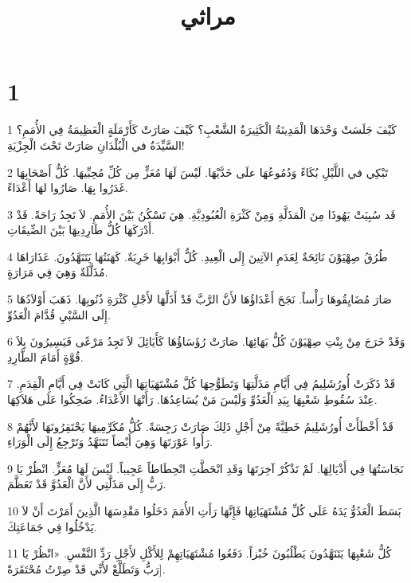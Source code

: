 

\title{مراثي}


\chapter{1}

\par 1 كَيْفَ جَلَسَتْ وَحْدَهَا الْمَدِينَةُ الْكَثِيرَةُ الشَّعْبِ؟ كَيْفَ صَارَتْ كَأَرْمَلَةٍ الْعَظِيمَةُ فِي الأُمَمِ؟ السَّيِّدَةُ في الْبُلْدَانِ صَارَتْ تَحْتَ الْجِزْيَةِ!
\par 2 تَبْكِي في اللَّيْلِ بُكَاءً وَدُمُوعُهَا علَى خَدَّيْهَا. لَيْسَ لَهَا مُعَزٍّ مِن كُلِّ مُحِبِّيهَا. كُلُّ أَصْحَابِهَا غَدَرُوا بِهَا. صَارُوا لهَا أَعْدَاءً.
\par 3 قَد سُبِيَتْ يَهُوذَا مِنَ الْمَذَلَّةِ وَمِنْ كَثْرَةِ الْعُبُودِيَّةِ. هِيَ تَسْكُنُ بَيْنَ الأُمَمِ. لاَ تَجِدُ رَاحَةً. قَدْ أَدْرَكَهَا كُلُّ طَارِدِيهَا بَيْنَ الضِّيقَاتِ.
\par 4 طُرُقُ صِهْيَوْنَ نَائِحَةٌ لِعَدَمِ الآتِينَ إِلَى الْعِيدِ. كُلُّ أَبْوَابِهَا خَرِبَةٌ. كَهَنَتُهَا يَتَنَهَّدُونَ. عَذَارَاهَا مُذَلَّلَةٌ وَهِيَ فِي مَرَارَةٍ.
\par 5 صَارَ مُضَايِقُوهَا رَأْساً. نَجَحَ أَعْدَاؤُهَا لأَنَّ الرَّبَّ قَدْ أَذَلَّهَا لأَجْلِ كَثْرَةِ ذُنُوبِهَا. ذَهَبَ أَوْلاَدُهَا إِلَى السَّبْيِ قُدَّامَ الْعَدُوِّ.
\par 6 وَقَدْ خَرَجَ مِنْ بِنْتِ صِهْيَوْنَ كُلُّ بَهَائِهَا. صَارَتْ رُؤَسَاؤُهَا كَأَيَائِلَ لاَ تَجِدُ مَرْعًى فَيَسِيرُونَ بِلاَ قُوَّةٍ أَمَامَ الطَّارِدِ.
\par 7 قَدْ ذَكَرَتْ أُورُشَلِيمُ فِي أَيَّامِ مَذَلَّتِهَا وَتَطَوُّحِهَا كُلَّ مُشْتَهَيَاتِهَا الَّتِي كَانَتْ فِي أَيَّامِ الْقِدَمِ. عِنْدَ سُقُوطِ شَعْبِهَا بِيَدِ الْعَدُوِّ وَلَيْسَ مَنْ يُسَاعِدُهَا. رَأَتْهَا الأَعْدَاءُ. ضَحِكُوا عَلَى هَلاَكِهَا.
\par 8 قَدْ أَخْطَأَتْ أُورُشَلِيمُ خَطِيَّةً مِنْ أَجْلِ ذَلِكَ صَارَتْ رَجِسَةً. كُلُّ مُكَرِّمِيهَا يَحْتَقِرُونَهَا لأَنَّهُمْ رَأُوا عَوْرَتَهَا وَهِيَ أَيْضاً تَتَنَهَّدُ وَتَرْجِعُ إِلَى الْوَرَاءِ.
\par 9 نَجَاسَتُهَا فِي أَذْيَالِهَا. لَمْ تَذْكُرْ آخِرَتَهَا وَقَدِ انْحَطَّتِ انْحِطَاطاً عَجِيباً. لَيْسَ لَهَا مُعَزٍّ. انْظُرْ يَا رَبُّ إِلَى مَذَلَّتِي لأَنَّ الْعَدُوَّ قَدْ تَعَظَّمَ.
\par 10 بَسَطَ الْعَدُوُّ يَدَهُ عَلَى كُلِّ مُشْتَهَيَاتِهَا فَإِنَّهَا رَأَتِ الأُمَمَ دَخَلُوا مَقْدِسَهَا الَّذِينَ أَمَرْتَ أَنْ لاَ يَدْخُلُوا فِي جَمَاعَتِكَ.
\par 11 كُلُّ شَعْبِهَا يَتَنَهَّدُونَ يَطْلُبُونَ خُبْزاً. دَفَعُوا مُشْتَهَيَاتِهِمْ لِلأَكْلِ لأَجْلِ رَدِّ النَّفْسِ. «انْظُرْ يَا رَبُّ وَتَطَلَّعْ لأَنِّي قَدْ صِرْتُ مُحْتَقَرَةً].
